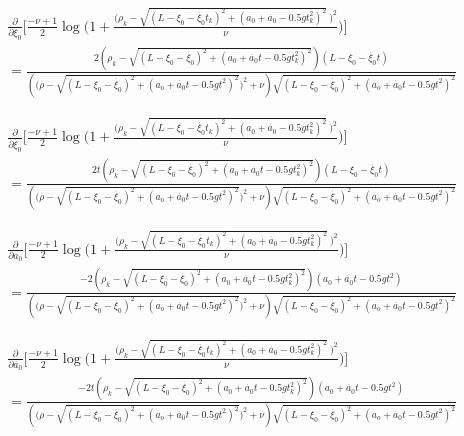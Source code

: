 \documentclass[11pt]{article}
\begin{document}
\begin{align*}
    \frac{\partial}{\partial \xi_0}\Bigg[\frac{-\nu+1}{2}\log\Bigg(1+ \frac{\Big(\rho_k - \sqrt{(L-\xi_0 - \dot{\xi_0}t_k)^2 + (a_0 + \dot{a_0} - 0.5gt_k^2)^2} \ \Big)^2}{\nu}\Bigg)\Bigg] \\
    = \frac{2(\rho_k - \sqrt{(L-\xi_0 - \dot{\xi_0})^2 + (a_0 + \dot{a_0}t - 0.5gt_k^2)^2})(L-\xi_0-\dot{\xi_0}t)}
    {(\Big(\rho - \sqrt{(L-\xi_0-\dot{\xi_0})^2 + (a_o + \dot{a_0}t-0.5gt^2)^2}\Big)^2 + \nu)\sqrt{(L-\xi_0-\dot{\xi_0})^2 + (a_o + \dot{a_0}t-0.5gt^2)^2}} 
\end{align*}

\begin{align*}
    \frac{\partial}{\partial \dot{\xi_0}}\Bigg[\frac{-\nu+1}{2}\log\Bigg(1+ \frac{\Big(\rho_k - \sqrt{(L-\xi_0 - \dot{\xi_0}t_k)^2 + (a_0 + \dot{a_0} - 0.5gt_k^2)^2} \ \Big)^2}{\nu}\Bigg)\Bigg] \\
    = \frac{2t(\rho_k - \sqrt{(L-\xi_0 - \dot{\xi_0})^2 + (a_0 + \dot{a_0}t - 0.5gt_k^2)^2})(L-\xi_0-\dot{\xi_0}t)}
    {(\Big(\rho - \sqrt{(L-\xi_0-\dot{\xi_0})^2 + (a_o + \dot{a_0}t-0.5gt^2)^2}\Big)^2 + \nu)\sqrt{(L-\xi_0-\dot{\xi_0})^2 + (a_o + \dot{a_0}t-0.5gt^2)^2}} 
\end{align*}

\begin{align*}
    \frac{\partial}{\partial a_0}\Bigg[\frac{-\nu+1}{2}\log\Bigg(1+ \frac{\Big(\rho_k - \sqrt{(L-\xi_0 - \dot{\xi_0}t_k)^2 + (a_0 + \dot{a_0} - 0.5gt_k^2)^2} \ \Big)^2}{\nu}\Bigg)\Bigg] \\
    = \frac{-2(\rho_k - \sqrt{(L-\xi_0 - \dot{\xi_0})^2 + (a_0 + \dot{a_0}t - 0.5gt_k^2)^2})(a_0+\dot{a_0}t-0.5gt^2)}
    {(\Big(\rho - \sqrt{(L-\xi_0-\dot{\xi_0})^2 + (a_o + \dot{a_0}t-0.5gt^2)^2}\Big)^2 + \nu)\sqrt{(L-\xi_0-\dot{\xi_0})^2 + (a_o + \dot{a_0}t-0.5gt^2)^2}} 
\end{align*}

\begin{align*}
    \frac{\partial}{\partial \dot{a_0}}\Bigg[\frac{-\nu+1}{2}\log\Bigg(1+ \frac{\Big(\rho_k - \sqrt{(L-\xi_0 - \dot{\xi_0}t_k)^2 + (a_0 + \dot{a_0} - 0.5gt_k^2)^2} \ \Big)^2}{\nu}\Bigg)\Bigg] \\
    = \frac{-2t(\rho_k - \sqrt{(L-\xi_0 - \dot{\xi_0})^2 + (a_0 + \dot{a_0}t - 0.5gt_k^2)^2})(a_0+\dot{a_0}t-0.5gt^2)}
    {(\Big(\rho - \sqrt{(L-\xi_0-\dot{\xi_0})^2 + (a_o + \dot{a_0}t-0.5gt^2)^2}\Big)^2 + \nu)\sqrt{(L-\xi_0-\dot{\xi_0})^2 + (a_o + \dot{a_0}t-0.5gt^2)^2}} 
\end{align*}
\end{document}
